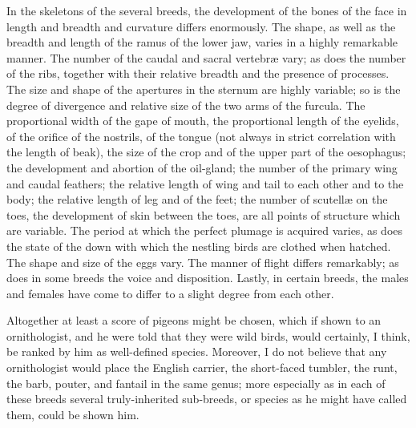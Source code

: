 \documentclass{book}
\begin{document}
In the skeletons of the several breeds, the development of the bones of the
face in length and breadth and curvature differs enormously. The shape, as well
as the breadth and length of the ramus of the lower jaw, varies in a highly
remarkable manner. The number of the caudal and sacral vertebræ vary; as does
the number of the ribs, together with their relative breadth and the presence
of processes. The size and shape of the apertures in the sternum are highly
variable; so is the degree of divergence and relative size of the two arms of
the furcula. The proportional width of the gape of mouth, the proportional
length of the eyelids, of the orifice of the nostrils, of the tongue (not
always in strict correlation with the length of beak), the size of the crop and
of the upper part of the oesophagus; the development and abortion of the
oil-gland; the number of the primary wing and caudal feathers; the relative
length of wing and tail to each other and to the body; the relative length of
leg and of the feet; the number of scutellæ on the toes, the development of
skin between the toes, are all points of structure which are variable. The
period at which the perfect plumage is acquired varies, as does the state of
the down with which the nestling birds are clothed when hatched. The shape and
size of the eggs vary. The manner of flight differs remarkably; as does in some
breeds the voice and disposition. Lastly, in certain breeds, the males and
females have come to differ to a slight degree from each other.

Altogether at least a score of pigeons might be chosen, which if shown to an
ornithologist, and he were told that they were wild birds, would certainly, I
think, be ranked by him as well-defined species. Moreover, I do not believe
that any ornithologist would place
the English carrier, the short-faced tumbler, the runt, the barb, pouter, and
fantail in the same genus; more especially as in each of these breeds several
truly-inherited sub-breeds, or species as he might have called them, could be
shown him.
\end{document}
